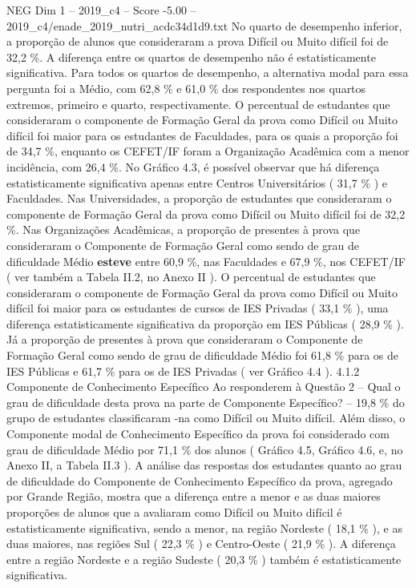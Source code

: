 \begin{textsample}{NEG Dim 1 – 2019\_c4 – Score -5.00 – 2019\_c4/enade\_2019\_nutri\_acdc34d1d9.txt}
No quarto de desempenho inferior, a proporção de alunos que consideraram a prova Difícil ou Muito difícil foi de 32,2 \%.
A diferença entre os quartos de desempenho não é estatisticamente significativa.
Para todos os quartos de desempenho, a alternativa modal para essa pergunta foi a Médio, com 62,8 \% e 61,0 \% dos respondentes nos quartos extremos, primeiro e quarto, respectivamente.
O percentual de estudantes que consideraram o componente de Formação Geral da prova como Difícil ou Muito difícil foi maior para os estudantes de Faculdades, para os quais a proporção foi de 34,7 \%, enquanto os CEFET/IF foram a Organização Acadêmica com a menor incidência, com 26,4 \%.
No Gráfico 4.3, é possível observar que há diferença estatisticamente significativa apenas entre Centros Universitários ( 31,7 \% ) e Faculdades.
Nas Universidades, a proporção de estudantes que consideraram o componente de Formação Geral da prova como Difícil ou Muito difícil foi de 32,2 \%.
Nas Organizações Acadêmicas, a proporção de presentes à prova que consideraram o Componente de Formação Geral como sendo de grau de dificuldade Médio \textbf{esteve} entre 60,9 \%, nas Faculdades e 67,9 \%, nos CEFET/IF ( ver também a Tabela II.2, no Anexo II ).
O percentual de estudantes que consideraram o componente de Formação Geral da prova como Difícil ou Muito difícil foi maior para os estudantes de cursos de IES Privadas ( 33,1 \% ), uma diferença estatisticamente significativa da proporção em IES Públicas ( 28,9 \% ).
Já a proporção de presentes à prova que consideraram o Componente de Formação Geral como sendo de grau de dificuldade Médio foi 61,8 \% para os de IES Públicas e 61,7 \% para os de IES Privadas ( ver Gráfico 4.4 ). 4.1.2 Componente de Conhecimento Específico Ao responderem à Questão 2 – Qual o grau de dificuldade desta prova na parte de Componente Específico? – 19,8 \% do grupo de estudantes classificaram -na como Difícil ou Muito difícil.
Além disso, o Componente modal de Conhecimento Específico da prova foi considerado com grau de dificuldade Médio por 71,1 \% dos alunos ( Gráfico 4.5, Gráfico 4.6, e, no Anexo II, a Tabela II.3 ).
A análise das respostas dos estudantes quanto ao grau de dificuldade do Componente de Conhecimento Específico da prova, agregado por Grande Região, mostra que a diferença entre a menor e as duas maiores proporções de alunos que a avaliaram como Difícil ou Muito difícil é estatisticamente significativa, sendo a menor, na região Nordeste ( 18,1 \% ), e as duas maiores, nas regiões Sul ( 22,3 \% ) e Centro-Oeste ( 21,9 \% ).
A diferença entre a região Nordeste e a região Sudeste ( 20,3 \% ) também é estatisticamente significativa.

\end{textsample}
